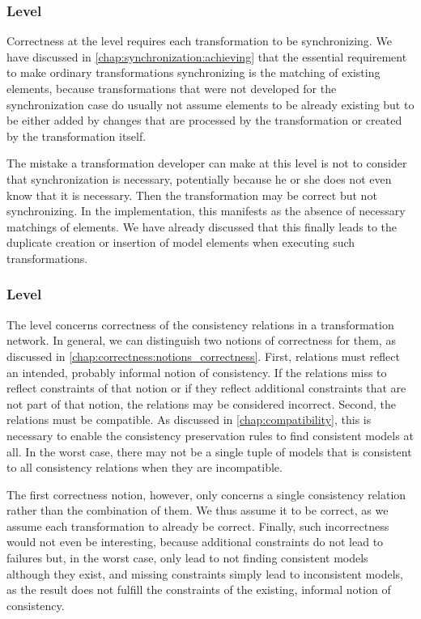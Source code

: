 \subsubsection*{\LevelTransformation Level}

Correctness at the \leveltransformation level requires each transformation to be synchronizing.
We have discussed in \autoref{chap:synchronization:achieving} that the essential requirement to make ordinary transformations synchronizing is the matching of existing elements, because transformations that were not developed for the synchronization case do usually not assume elements to be already existing but to be either added by changes that are processed by the transformation or created by the transformation itself.

The mistake a transformation developer can make at this level is not to consider that synchronization is necessary, potentially because he or she does not even know that it is necessary. Then the transformation may be correct but not synchronizing.
In the implementation, this manifests as the absence of necessary matchings of elements.
We have already discussed that this finally leads to the duplicate creation or insertion of model elements when executing such transformations.


\subsubsection*{\LevelNetworkRelation Level}

The \levelnetworkrelation level concerns correctness of the consistency relations in a transformation network.
In general, we can distinguish two notions of correctness for them, as discussed in \autoref{chap:correctness:notions_correctness}.
First, relations must reflect an intended, probably informal notion of consistency.
If the relations miss to reflect constraints of that notion or if they reflect additional constraints that are not part of that notion, the relations may be considered incorrect.
Second, the relations must be compatible.
As discussed in \autoref{chap:compatibility}, this is necessary to enable the consistency preservation rules to find consistent models at all.
In the worst case, there may not be a single tuple of models that is consistent to all consistency relations when they are incompatible.

The first correctness notion, however, only concerns a single consistency relation rather than the combination of them.
We thus assume it to be correct, as we assume each transformation to already be correct.
Finally, such incorrectness would not even be interesting, because additional constraints do not lead to failures but, in the worst case, only lead to not finding consistent models although they exist, and missing constraints simply lead to inconsistent models, as the result does not fulfill the constraints of the existing, informal notion of consistency.

